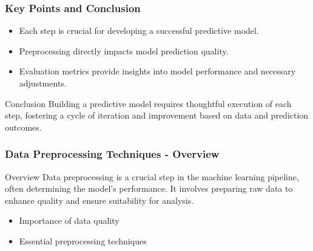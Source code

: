 \documentclass{beamer}
\begin{document}
\begin{frame}
    \frametitle{Key Points and Conclusion}
    \begin{itemize}
        \item Each step is crucial for developing a successful predictive model.
        \item Preprocessing directly impacts model prediction quality.
        \item Evaluation metrics provide insights into model performance and necessary adjustments.
    \end{itemize}
    
    \begin{block}{Conclusion}
        Building a predictive model requires thoughtful execution of each step, fostering a cycle of iteration and improvement based on data and prediction outcomes.
    \end{block}
\end{frame}

\begin{frame}[fragile]
    \frametitle{Data Preprocessing Techniques - Overview}
    \begin{block}{Overview}
        Data preprocessing is a crucial step in the machine learning pipeline, often determining the model's performance. 
        It involves preparing raw data to enhance quality and ensure suitability for analysis.
    \end{block}
    
    \begin{itemize}
        \item Importance of data quality
        \item Essential preprocessing techniques
    \end{itemize}
\end{frame}
\end{document}
